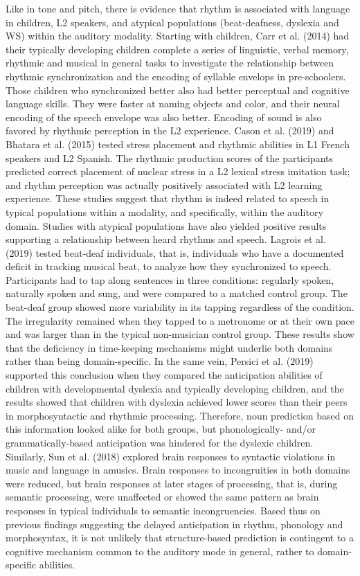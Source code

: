 \documentclass[english,man]{apa6}
\begin{document}
Like in tone and pitch, there is evidence that rhythm is associated with language in children, L2 speakers, and atypical populations (beat-deafness, dyslexia and WS) within the auditory modality. Starting with children, Carr et al. (2014) had their typically developing children complete a series of linguistic, verbal memory, rhythmic and musical in general tasks to investigate the relationship between rhythmic synchronization and the encoding of syllable envelops in pre-schoolers. Those children who synchronized better also had better perceptual and cognitive language skills. They were faster at naming objects and color, and their neural encoding of the speech envelope was also better. Encoding of sound is also favored by rhythmic perception in the L2 experience. Cason et al. (2019) and Bhatara et al. (2015) tested stress placement and rhythmic abilities in L1 French speakers and L2 Spanish. The rhythmic production scores of the participants predicted correct placement of nuclear stress in a L2 lexical stress imitation task; and rhythm perception was actually positively associated with L2 learning experience. These studies suggest that rhythm is indeed related to speech in typical populations within a modality, and specifically, within the auditory domain.
Studies with atypical populations have also yielded positive results supporting a relationship between heard rhythms and speech. Lagrois et al. (2019) tested beat-deaf individuals, that is, individuals who have a documented deficit in tracking musical beat, to analyze how they synchronized to speech. Participants had to tap along sentences in three conditions: regularly spoken, naturally spoken and sung, and were compared to a matched control group. The beat-deaf group showed more variability in its tapping regardless of the condition. The irregularity remained when they tapped to a metronome or at their own pace and was larger than in the typical non-musician control group. These results show that the deficiency in time-keeping mechanisms might underlie both domains rather than being domain-specific. In the same vein, Persici et al. (2019) supported this conclusion when they compared the anticipation abilities of children with developmental dyslexia and typically developing children, and the results showed that children with dyslexia achieved lower scores than their peers in morphosyntactic and rhythmic processing. Therefore, noun prediction based on this information looked alike for both groups, but phonologically- and/or grammatically-based anticipation was hindered for the dyslexic children. Similarly, Sun et al. (2018) explored brain responses to syntactic violations in music and language in amusics. Brain responses to incongruities in both domains were reduced, but brain responses at later stages of processing, that is, during semantic processing, were unaffected or showed the same pattern as brain responses in typical individuals to semantic incongruencies. Based thus on previous findings suggesting the delayed anticipation in rhythm, phonology and morphosyntax, it is not unlikely that structure-based prediction is contingent to a cognitive mechanism common to the auditory mode in general, rather to domain-specific abilities.
\end{document}
